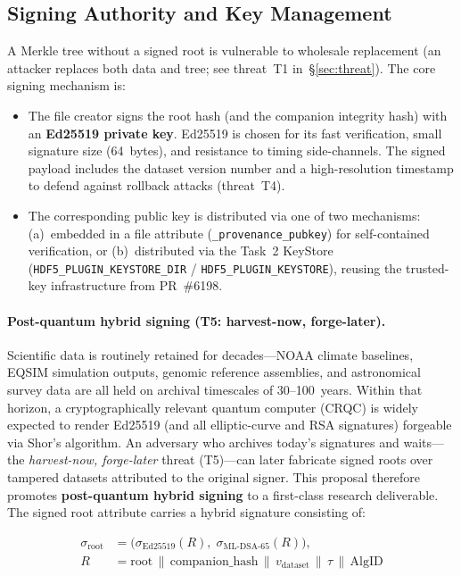 \documentclass[11pt]{article}
\begin{document}
\subsection{Signing Authority and Key Management}
\label{sec:signing}

A Merkle tree without a signed root is vulnerable to wholesale replacement (an
attacker replaces both data and tree; see threat~T1 in~\S\ref{sec:threat}). The
core signing mechanism is:

\begin{itemize}[nosep]
  \item The file creator signs the root hash (and the companion integrity hash)
    with an \textbf{Ed25519 private key}. Ed25519 is chosen for its fast
    verification, small signature size (64~bytes), and resistance to
    timing side-channels. The signed payload includes the dataset version
    number and a high-resolution timestamp to defend against rollback attacks
    (threat~T4).
  \item The corresponding public key is distributed via one of two mechanisms:
    (a)~embedded in a file attribute (\texttt{\_provenance\_pubkey}) for
    self-contained verification, or (b)~distributed via the Task~2 KeyStore
    (\texttt{HDF5\_PLUGIN\_KEYSTORE\_DIR} / \texttt{HDF5\_PLUGIN\_KEYSTORE}),
    reusing the trusted-key infrastructure from PR~\#6198.
\end{itemize}

\paragraph{Post-quantum hybrid signing (T5: harvest-now, forge-later).}
\label{sec:pq-hybrid}
Scientific data is routinely retained for decades---NOAA climate baselines,
EQSIM simulation outputs, genomic reference assemblies, and astronomical
survey data are all held on archival timescales of 30--100~years. Within that
horizon, a cryptographically relevant quantum computer (CRQC) is widely
expected to render Ed25519 (and all elliptic-curve and RSA signatures)
forgeable via Shor's algorithm. An adversary who archives today's signatures
and waits---the \emph{harvest-now, forge-later} threat (T5)---can later
fabricate signed roots over tampered datasets attributed to the original
signer. This proposal therefore promotes \textbf{post-quantum hybrid signing}
to a first-class research deliverable. The signed root attribute carries a
hybrid signature consisting of:

\begin{equation}
\begin{aligned}
  \sigma_\text{root} &= \bigl(\sigma_\text{Ed25519}(R),\;
                             \sigma_\text{ML-DSA-65}(R)\bigr), \\
  R &= \text{root} \,\|\, \text{companion\_hash} \,\|\,
       v_\text{dataset} \,\|\, \tau \,\|\, \text{AlgID}
\end{aligned}
\end{equation}
\end{document}
